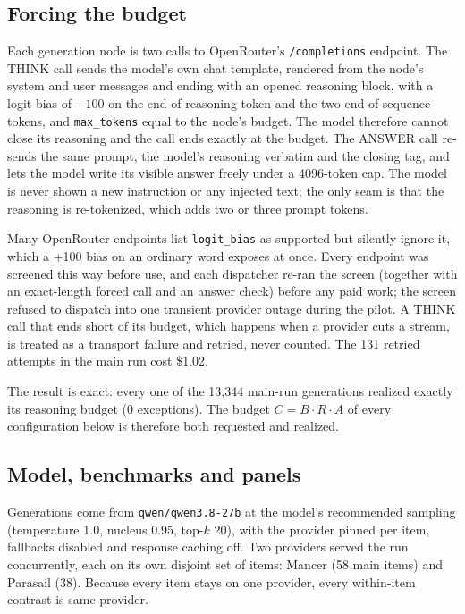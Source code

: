 \documentclass[11pt]{article}
\begin{document}
\subsection{Forcing the budget}

Each generation node is two calls to OpenRouter's \texttt{/completions} endpoint. The THINK call sends
the model's own chat template, rendered from the node's system and user messages and ending with an
opened reasoning block, with a logit bias of $-100$ on the end-of-reasoning token and the two
end-of-sequence tokens, and \texttt{max\_tokens} equal to the node's budget. The model therefore cannot
close its reasoning and the call ends exactly at the budget. The ANSWER call re-sends the same prompt,
the model's reasoning verbatim and the closing tag, and lets the model write its visible answer freely
under a 4096-token cap. The model is never shown a new instruction or any injected text; the only seam is
that the reasoning is re-tokenized, which adds two or three prompt tokens.

Many OpenRouter endpoints list \texttt{logit\_bias} as supported but silently ignore it, which a +100
bias on an ordinary word exposes at once. Every endpoint was screened this way before use, and each
dispatcher re-ran the screen (together with an exact-length forced call and an answer check) before any
paid work; the screen refused to dispatch into one transient provider outage during the pilot. A THINK
call that ends short of its budget, which happens when a provider cuts a stream, is treated as a
transport failure and retried, never counted. The 131 retried attempts in the main run
cost \$1.02.

The result is exact: every one of the 13,344 main-run generations realized exactly its
reasoning budget (0 exceptions). The budget $C = B\cdot R\cdot A$
of every configuration below is therefore both requested and realized.

\subsection{Model, benchmarks and panels}

Generations come from \texttt{qwen/qwen3.8-27b} at the model's recommended sampling (temperature 1.0,
nucleus 0.95, top-$k$ 20), with the provider pinned per item, fallbacks disabled and response caching
off. Two providers served the run concurrently, each on its own disjoint set of items: Mancer
(58 main items) and Parasail (38). Because every item stays on
one provider, every within-item contrast is same-provider.
\end{document}
